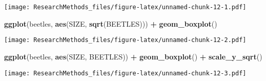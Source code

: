 \documentclass[]{book}
\newenvironment{Shaded}{\begin{snugshade}}{\end{snugshade}}
\newcommand{\KeywordTok}[1]{\textcolor[rgb]{0.13,0.29,0.53}{\textbf{#1}}}
\newcommand{\StringTok}[1]{\textcolor[rgb]{0.31,0.60,0.02}{#1}}
\newcommand{\OperatorTok}[1]{\textcolor[rgb]{0.81,0.36,0.00}{\textbf{#1}}}
\newcommand{\NormalTok}[1]{#1}
\begin{document}
\texttt{[image: ResearchMethods\_files/figure-latex/unnamed-chunk-12-1.pdf]}

\begin{Shaded}
\begin{Highlighting}[]


\KeywordTok{ggplot}\NormalTok{(beetles, }\KeywordTok{aes}\NormalTok{(SIZE, }\KeywordTok{sqrt}\NormalTok{(BEETLES))) }\OperatorTok{+}
\StringTok{  }\KeywordTok{geom_boxplot}\NormalTok{()}
\end{Highlighting}
\end{Shaded}

\texttt{[image: ResearchMethods\_files/figure-latex/unnamed-chunk-12-2.pdf]}

\begin{Shaded}
\begin{Highlighting}[]


\KeywordTok{ggplot}\NormalTok{(beetles, }\KeywordTok{aes}\NormalTok{(SIZE, BEETLES)) }\OperatorTok{+}
\StringTok{  }\KeywordTok{geom_boxplot}\NormalTok{() }\OperatorTok{+}
\StringTok{  }\KeywordTok{scale_y_sqrt}\NormalTok{()}
\end{Highlighting}
\end{Shaded}

\texttt{[image: ResearchMethods\_files/figure-latex/unnamed-chunk-12-3.pdf]}
\end{document}
